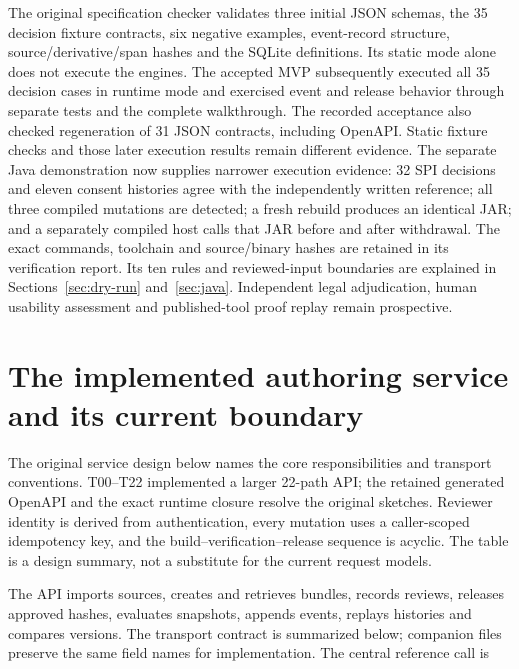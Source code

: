 \documentclass[12pt,a4paper,oneside,openany]{book}
\begin{document}
The original specification checker validates three initial JSON schemas,
the 35 decision fixture contracts, six negative examples, event-record structure,
source/derivative/span hashes and the SQLite definitions. Its static mode alone
does not execute the engines. The accepted MVP subsequently executed all 35
decision cases in runtime mode and exercised event and release behavior through
separate tests and the complete walkthrough. The recorded acceptance also checked
regeneration of 31 JSON contracts, including OpenAPI. Static fixture checks and
those later execution results remain different evidence. The separate Java
demonstration now supplies narrower execution evidence: 32 SPI decisions and eleven
consent histories agree with the independently written reference; all three
compiled mutations are detected; a fresh rebuild produces an identical JAR;
and a separately compiled host calls that JAR before and after withdrawal.
The exact commands, toolchain and source/binary hashes are retained in its
verification report. Its ten rules and reviewed-input boundaries are explained
in Sections~\ref{sec:dry-run} and~\ref{sec:java}. Independent legal adjudication,
human usability assessment and published-tool proof replay remain prospective.

\section{The implemented authoring service and its current boundary}

The original service design below names the core responsibilities and transport
conventions. T00--T22 implemented a larger 22-path API; the retained generated
OpenAPI and the exact runtime closure resolve the original sketches. Reviewer
identity is derived from authentication, every mutation uses a caller-scoped
idempotency key, and the build--verification--release sequence is acyclic.
The table is a design summary, not a substitute for the current request models.


\label{merge:P-03c-storage-review:02}


The API imports sources, creates and retrieves bundles, records reviews, releases
approved hashes, evaluates snapshots, appends events, replays histories and
compares versions. The transport contract is summarized below; companion files
preserve the same field names for implementation. The central reference call is
\end{document}
